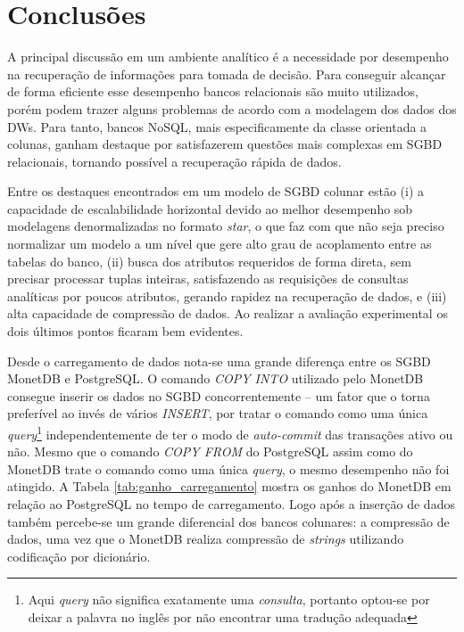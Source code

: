 \chapter{Conclusões}

A principal discussão em um ambiente analítico é a necessidade por desempenho na recuperação de informações para tomada de decisão. Para conseguir alcançar de forma eficiente esse desempenho bancos relacionais são muito utilizados, porém podem trazer alguns problemas de acordo com a modelagem dos dados dos DWs. Para tanto, bancos NoSQL, mais especificamente da classe orientada a colunas, ganham destaque por satisfazerem questões mais complexas em SGBD relacionais, tornando possível a recuperação rápida de dados.

Entre os destaques encontrados em um modelo de SGBD colunar estão (i) a capacidade de escalabilidade horizontal devido ao melhor desempenho sob modelagens denormalizadas no formato \textit{star}, o que faz com que não seja preciso normalizar um modelo a um nível que gere alto grau de acoplamento entre as tabelas do banco, (ii) busca dos atributos requeridos de forma direta, sem precisar processar tuplas inteiras, satisfazendo as requisições de consultas analíticas por poucos atributos, gerando rapidez na recuperação de dados, e (iii) alta capacidade de compressão de dados. Ao realizar a avaliação experimental os dois últimos pontos ficaram bem evidentes.

Desde o carregamento de dados nota-se uma grande diferença entre os SGBD MonetDB e PostgreSQL. O comando \textit{COPY INTO} utilizado pelo MonetDB consegue inserir os dados no SGBD concorrentemente -- um fator que o torna preferível ao invés de vários \textit{INSERT}, por tratar o comando como uma única \textit{query}\footnote{Aqui \textit{query} não significa exatamente uma \textit{consulta}, portanto optou-se por deixar a palavra no inglês por não encontrar uma tradução adequada} independentemente de ter o modo de \textit{auto-commit} das transações ativo ou não. Mesmo que o comando \textit{COPY FROM} do PostgreSQL assim como do MonetDB trate o comando como uma única \textit{query}, o mesmo desempenho não foi atingido. A Tabela \ref{tab:ganho_carregamento} mostra os ganhos do MonetDB em relação ao PostgreSQL no tempo de carregamento. Logo após a inserção de dados também percebe-se um grande diferencial dos bancos colunares: a compressão de dados, uma vez que o MonetDB realiza compressão de \textit{strings} utilizando codificação por dicionário.

